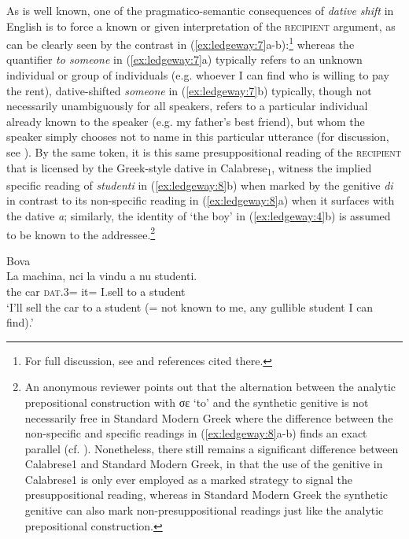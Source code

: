 \documentclass[output=paper,modfonts,nonflat,colorlinks,citecolor=brown]{langsci/langscibook}
\begin{document}
As is well known, one of the pragmatico-semantic consequences of \textit{dative shift} in English is to force a known or given interpretation of the \textsc{recipient} argument, as can be clearly seen by the contrast in (\ref{ex:ledgeway:7}a-b):\footnote{For full discussion, see \citet{Larson1988, Larson1990,Jackendoff1990larson,Torrego1998} and references cited there.} whereas the quantifier \textit{to someone} in (\ref{ex:ledgeway:7}a) typically refers to an unknown individual or group of individuals (e.g. whoever I can find who is willing to pay the rent), dative-shifted \textit{someone} in (\ref{ex:ledgeway:7}b) typically, though not necessarily unambiguously for all speakers, refers to a particular individual already known to the speaker (e.g. my father’s best friend), but whom the speaker simply chooses not to name in this particular utterance (for discussion, see \citealt{AounLi1993}). By the same token, it is this same presuppositional reading of the \textsc{recipient} that is licensed by the Greek-style dative in Calabrese\textsubscript{1}, witness the implied specific reading of \textit{studenti} in (\ref{ex:ledgeway:8}b) when marked by the genitive \textit{di} in contrast to its non-specific reading in (\ref{ex:ledgeway:8}a) when it surfaces with the dative \textit{a}; similarly, the identity of `the boy' in (\ref{ex:ledgeway:4}b) is assumed to be known to the addressee.\footnote{An anonymous reviewer points out that the alternation between the analytic prepositional construction with σε ‘to’ and the synthetic genitive is not necessarily free in Standard Modern Greek where the difference between the non-specific and specific readings in (\ref{ex:ledgeway:8}a-b) finds an exact parallel (cf. \citealt{Dimitriadis1999,Michelioudakis2012}). Nonetheless, there still remains a significant difference between Calabrese1 and Standard Modern Greek, in that the use of the genitive in Calabrese1 is only ever employed as a marked strategy to signal the presuppositional reading, whereas in Standard Modern Greek the synthetic genitive can also mark non-presuppositional readings just like the analytic prepositional construction.}

\ea\label{ex:ledgeway:8}
  Bova\\
\ea
	\gll La  machina,  nci  la  vindu  a  nu  studenti.\\
      the  car  \textsc{dat}.3=  it=  I.sell  to  a  student\\
      \glt `I’ll sell the car to a student (= not known to me, any gullible student I can find).'
\end{document}
